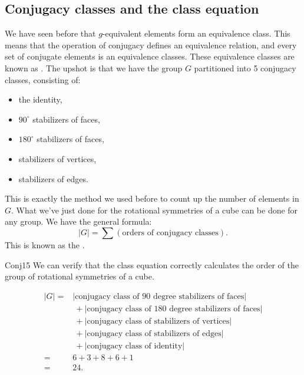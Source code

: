 
\subsection{Conjugacy classes and the class equation}

We have seen before that $g$-equivalent elements form an equivalence class. This means that the operation of conjugacy defines an equivalence relation, and every set of conjugate elements is an equivalence classes. These equivalence classes are known as .
The upshot is that we have the group $G$ partitioned into 5 conjugacy classes, consisting of: 
\begin{itemize}
\item
the identity, 
\item
 $90^{\circ}$ stabilizers of faces, 
\item
$180^{\circ}$ stabilizers of faces, 
\item
stabilizers of vertices, 
\item
stabilizers of edges. 
\end{itemize}

This is exactly the method we used before to count up the number of elements in $G$.  
What we've just done for the rotational symmetries of a cube can be done for any group.  We have the general formula:
$$|G| = \sum (\text{orders of conjugacy classes}).$$
This is known as the .

\begin{example}{Conj15}
  We can verify that the class equation correctly calculates the order of the group of rotational symmetries of a cube. 

\begin{align*}
|G|=&|\text{conjugacy class of 90 degree stabilizers of faces}| \\
&~+|\text{conjugacy class of 180 degree stabilizers of faces}|\\
&~+|\text{conjugacy class of stabilizers of vertices}|\\
&~+|\text{conjugacy class of stabilizers of edges}|\\
&~+|\text{conjugacy class of identity}|\\
=&6+3+8+6+1\\
=&24.
\end{align*}
\end{example}

